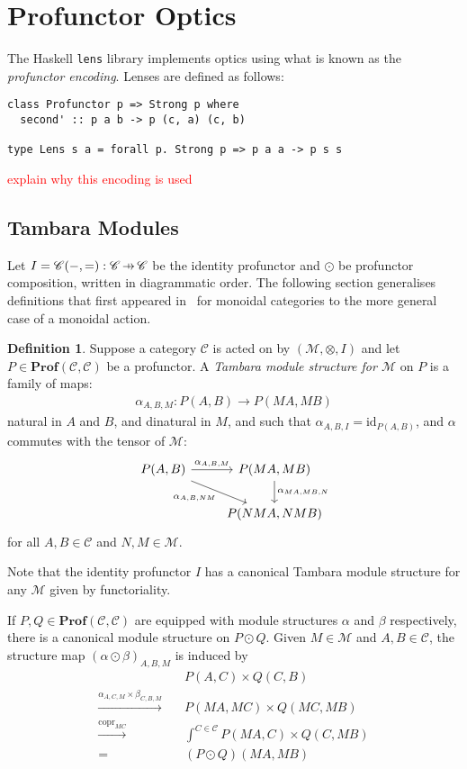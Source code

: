 \documentclass[11pt,a4paper]{article}
\theoremstyle{plain}
\theoremstyle{definition}
\newtheorem{definition}[theorem]{Definition}
\newcommand{\C}{\mathscr{C}}
\newcommand{\M}{\mathscr{M}}
\newcommand{\lenslib}{\texttt{lens}}
\newcommand{\Prof}{\mathbf{Prof}}
\newcommand{\id}{\mathrm{id}}
\DeclareMathOperator{\copr}{copr}
\newcommand{\hto}{\ensuremath{\,\mathaccent\shortmid\rightarrow\,}}
\newcommand{\todo}[1]{\textcolor{red}{\small #1}}
\begin{document}
\section{Profunctor Optics}\label{sec:profunctor-optics}
The Haskell \lenslib{} library implements optics using what is known as the \emph{profunctor encoding}. Lenses are defined as follows:

\begin{verbatim}
class Profunctor p => Strong p where
  second' :: p a b -> p (c, a) (c, b)

type Lens s a = forall p. Strong p => p a a -> p s s
\end{verbatim}

\todo{explain why this encoding is used}

\subsection{Tambara Modules}
Let $I = \C(-,{=}) : \C \hto \C$ be the identity profunctor and $\odot$ be profunctor composition, written in diagrammatic order. The following section generalises definitions that first appeared in~\cite[Section 3]{Doubles} for monoidal categories to the more general case of a monoidal action.

\begin{definition}
  Suppose a category $\C$ is acted on by $(\M, \otimes, I)$ and let $P \in \Prof(\C, \C)$ be a profunctor. A \emph{Tambara module structure for $\M$} on $P$ is a family of maps:
  \begin{align*}
    \alpha_{A,B,M} : P(A,B) \to P(MA, MB)
  \end{align*}
  natural in $A$ and $B$, and dinatural in $M$, and such that $\alpha_{A,B,I} = \id_{P(A,B)}$, and $\alpha$ commutes with the tensor of $\M$:
  \[
    \begin{tikzcd}
      P(A,B) \ar[r, "\alpha_{A,B,M}"] \ar[dr, "\alpha_{A, B, NM}" below left] & P(MA, MB) \ar[d, "\alpha_{MA, MB, N}" right] \\
      & P(NMA, NMB)
    \end{tikzcd}
  \]
  for all $A, B \in \C$ and $N, M \in \M$.
\end{definition}

Note that the identity profunctor $I$ has a canonical Tambara module structure for any $\M$ given by functoriality.

If $P, Q \in \Prof(\C, \C)$ are equipped with module structures $\alpha$ and $\beta$ respectively, there is a canonical module structure on $P \odot Q$. Given $M \in \M$ and $A,B \in \C$, the structure map $(\alpha \odot \beta)_{A,B,M}$ is induced by
\begin{align*}
  &P(A,C) \times Q(C,B)  \\
  \xrightarrow{\alpha_{A,C,M} \times \beta_{C,B,M}} \quad& P(MA, MC) \times Q(MC, MB) \\
  \xrightarrow{\copr_{MC}} \quad&\int^{C \in \C} P(MA, C) \times Q(C, MB) \\
  = \quad&(P \odot Q)(MA, MB)
\end{align*}
\end{document}
